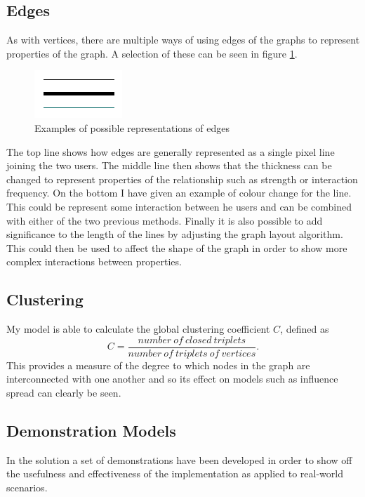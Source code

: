 \documentclass[12pt,a4paper]{article}
\begin{document}
\subsection{Edges}
\noindent
As with vertices, there are multiple ways of using edges of the graphs to represent properties of the graph. A selection of these can be seen in figure \ref{fig:edges}.

\begin{figure}[htb]
\caption{Examples of possible representations of edges}
\label{fig:edges}
\centering
\includegraphics[scale=0.7]{Edges.png}
\end{figure}

The top line shows how edges are generally represented as a single pixel line joining the two users. The middle line then shows that the thickness can be changed to represent properties of the relationship such as strength or interaction frequency. On the bottom I have given an example of colour change for the line. This could be represent some interaction between he users and can be combined with either of the two previous methods. Finally it is also possible to add significance to the length of the lines by adjusting the graph layout algorithm. This could then be used to affect the shape of the graph in order to show more complex interactions between properties.

\subsection{Clustering}
\noindent
My model is able to calculate the global clustering coefficient $C$, defined as
\begin{equation}
\label{clustering}
C=\frac{number\ of\ closed\ triplets}{number\ of\ triplets\ of\ vertices}.
\end{equation}
This provides a measure of the degree to which nodes in the graph are interconnected with one another and so its effect on models such as influence spread can clearly be seen.

\subsection{Demonstration Models}
\noindent
In the solution a set of demonstrations have been developed in order to show off the usefulness and effectiveness of the implementation as applied to real-world scenarios.
\end{document}
